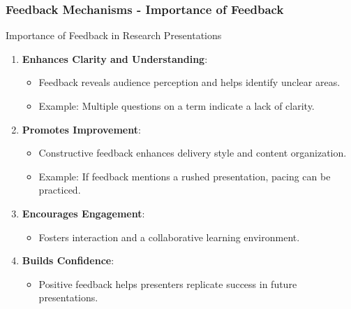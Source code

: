 \documentclass[aspectratio=169]{beamer}
\begin{document}
\begin{frame}[fragile]
    \frametitle{Feedback Mechanisms - Importance of Feedback}
    \begin{block}{Importance of Feedback in Research Presentations}
        \begin{enumerate}
            \item \textbf{Enhances Clarity and Understanding}:
                \begin{itemize}
                    \item Feedback reveals audience perception and helps identify unclear areas.
                    \item Example: Multiple questions on a term indicate a lack of clarity.
                \end{itemize}
            \item \textbf{Promotes Improvement}:
                \begin{itemize}
                    \item Constructive feedback enhances delivery style and content organization.
                    \item Example: If feedback mentions a rushed presentation, pacing can be practiced.
                \end{itemize}
            \item \textbf{Encourages Engagement}:
                \begin{itemize}
                    \item Fosters interaction and a collaborative learning environment.
                \end{itemize}
            \item \textbf{Builds Confidence}:
                \begin{itemize}
                    \item Positive feedback helps presenters replicate success in future presentations.
                \end{itemize}
        \end{enumerate}
    \end{block}
\end{frame}
\end{document}
